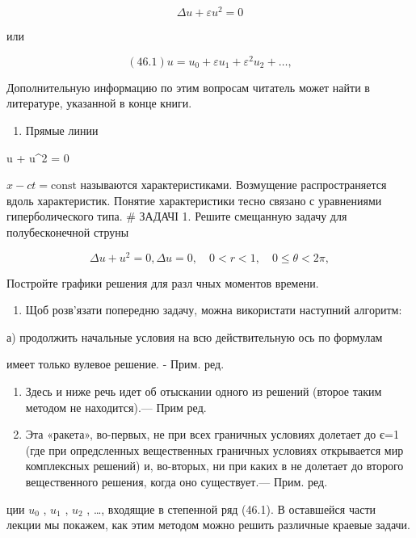 \documentclass[
  ukrainian,
]{article}
\providecommand{\tightlist}{%
  \setlength{\itemsep}{0pt}\setlength{\parskip}{0pt}}
\begin{document}
\[
\Delta u + \varepsilon u^2 = 0
\]

или

\[
(46.1) u = u_0 + \varepsilon u_1 + \varepsilon^2 u_2 + \dots,
\]

Дополнительную информацию по этим вопросам читатель может найти в
литературе, указанной в конце книги.

\begin{enumerate}
\def\labelenumi{\arabic{enumi}.}
\setcounter{enumi}{2}
\tightlist
\item
  Прямые линии
\end{enumerate}

 u + u\^{}2 = 0

\(x - ct = \text{const}\) называются характеристиками. Возмущение
распространяется вдоль характеристик. Понятие характеристики тесно
связано с уравнениями гиперболического типа. \# ЗАДАЧІ 1. Решите
смещанную задачу для полубесконечной струны

\[
\Delta u + u^2 = 0,
\Delta u = 0, \quad 0 < r < 1, \quad 0 \le \theta < 2\pi,
\]

Постройте графики решения для разл чных моментов времени.

\begin{enumerate}
\def\labelenumi{\arabic{enumi}.}
\setcounter{enumi}{1}
\tightlist
\item
  Щоб розв'язати попередню задачу, можна використати наступний алгоритм:
\end{enumerate}

а) продолжить начальные условия на всю действительную ось по формулам

имеет только вулевое решение. - Прим. ред.

\begin{enumerate}
\def\labelenumi{\arabic{enumi})}
\setcounter{enumi}{1}
\item
  Здесь и ниже речь идет об отыскании одного из решений (второе таким
  методом не находится).--- Прим ред.
\item
  Эта «ракета», во-первых, не при всех граничных условиях долетает до
  є=1 (где при опредсленных вещественных граничных условиях открывается
  мир комплексных решений) и, во-вторых, ни при каких в не долетает до
  второго вещественного решения, когда оно существует.--- Прим. ред.
\end{enumerate}

ции \(u_0\) , \(u_1\) , \(u_2\) , \ldots, входящие в степенной ряд
(46.1). В оставшейся части лекции мы покажем, как этим методом можно
решить различные краевые задачи.
\end{document}
